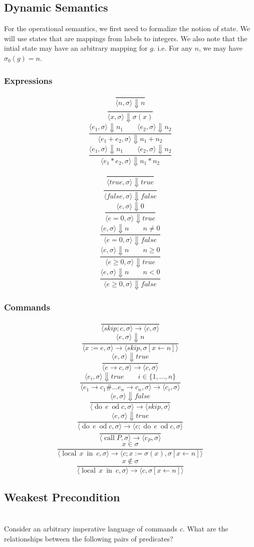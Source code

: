 \documentclass{article}
\newcommand{\problem}[1]
{\subsubsection*{} %
\vspace{-16pt} \section{} \vspace{-22pt} \qquad
#1%
\bigskip \bigskip
}
\newcommand{\dood}[1]{\operatorname{do}\, #1\ \operatorname{od}}
\newcommand{\callP}{\operatorname{call} P}
\newcommand{\localin}[2]{\operatorname{local}\, #1\ \operatorname{in}\ #2}
\begin{document}
\subsection{Dynamic Semantics}
\newcommand{\bigstep}[3]{\langle #1, #2 \rangle \Downarrow #3}
\newcommand{\smallstep}[4]{\langle #1, #2 \rangle \rightarrow \langle #3, #4 \rangle}

    For the operational semantics, we first need to formalize the notion of
    state.  We will use states that are mappings from labels to integers. We also note that the intial state may have an arbitrary mapping for $g$.  i.e. For any $n$, we may have $\sigma_0(g) = n$.
\subsubsection*{Expressions}
\[\frac{}
{\bigstep{n}{\sigma}{ n}}
\]
\[\frac{}
{\bigstep{x}{\sigma}{\sigma(x)}}
\]
\[\frac{\bigstep{e_1}{\sigma}{n_1} \qquad \bigstep{e_2}{\sigma}{n_2}}
{\bigstep{e_1 + e_2}{\sigma}{n_1 + n_2}}
\]
\[\frac{\bigstep{e_1}{\sigma}{n_1} \qquad \bigstep{e_2}{\sigma}{n_2}}
{\bigstep{e_1 * e_2}{\sigma}{n_1 * n_2}}
\]

\[\frac{}
{\bigstep{true}{\sigma}{true}}
\]
\[\frac{}
{\bigstep{false}{\sigma}{false}}
\]
\[\frac{\bigstep{e}{\sigma}{0}}
{\bigstep{e = 0}{\sigma}{ true }}
\]
\[\frac{\bigstep{e}{\sigma}{n} \qquad n \ne 0}
{\bigstep{e = 0}{\sigma}{false}}
\]
\[\frac{\bigstep{e}{\sigma}{n} \qquad n \ge 0}
{\bigstep{e \ge 0}{\sigma}{true}}
\]
\[\frac{\bigstep{e}{\sigma}{n} \qquad n < 0}
{\bigstep{e \ge 0}{\sigma}{false}}
\]


\subsubsection*{Commands}
\[\frac{}
{\smallstep{skip;c}{\sigma}{c}{\sigma}}
\]
\[\frac{\bigstep{e}{\sigma}{n}}
{\smallstep{x := e}{\sigma}{skip}{\sigma[x \gets n]}}
\]
\[\frac{\bigstep{e}{\sigma}{true}}
{\smallstep{e \rightarrow c}{\sigma}{c}{\sigma}}
\]
\[\frac{\bigstep{e_i}{\sigma}{true} \qquad i \in \{1,\dots,n\}}
{\smallstep{e_1 \rightarrow c_1 \# \dots e_n \rightarrow c_n}{\sigma}{c_i}{\sigma}}
\]
\[\frac{\bigstep{e}{\sigma}{false}}
{\smallstep{\dood{e}{c}}{\sigma}{skip}{\sigma}}
\]
\[\frac{\bigstep{e}{\sigma}{true}}
{\smallstep{\dood{e}{c}}{\sigma}{c;\dood{e}{c}}{\sigma}}
\]
\[\frac{}
{\smallstep{\callP}{\sigma}{c_P}{\sigma}}
\]
\[\frac{x \in \sigma}
{\smallstep{\localin{x}{c}}{\sigma}{c; x := \sigma(x) }{\sigma[x \gets n]}}
\]
\[\frac{x \not\in \sigma}
{\smallstep{\localin{x}{c}}{\sigma}{c}{\sigma[x \gets n]}}
\]

\subsection{Weakest Precondition}

\problem{Consider an arbitrary imperative language of commands $c$. What are
the relationships between the following pairs of predicates?}
\end{document}
